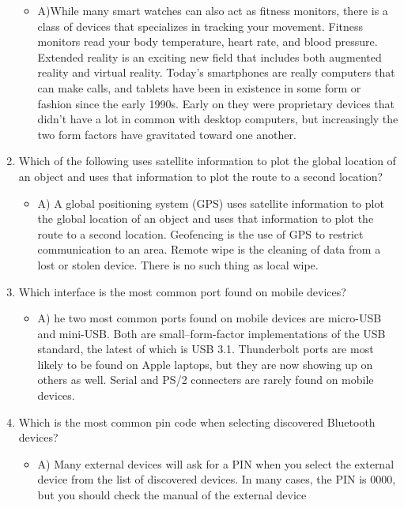 \documentclass{article}
\begin{document}
\begin{enumerate}
    \begin{itemize}
        \item A)While many smart watches can also act as fitness monitors, there is a class of devices
that specializes in tracking your movement. Fitness monitors read your body temperature,
heart rate, and blood pressure. Extended reality is an exciting new field that includes
both augmented reality and virtual reality. Today’s smartphones are really computers
that can make calls, and tablets have been in existence in some form or fashion since the
early 1990s. Early on they were proprietary devices that didn’t have a lot in common with
desktop computers, but increasingly the two form factors have gravitated toward one
another.
    \end{itemize}
    \item Which of the following uses satellite information to plot the global location of an object
and uses that information to plot the route to a second location?
    \begin{itemize}
        \item A) A global positioning system (GPS) uses satellite information to plot the global location
of an object and uses that information to plot the route to a second location. Geofencing is
the use of GPS to restrict communication to an area. Remote wipe is the cleaning of data
from a lost or stolen device. There is no such thing as local wipe.
    \end{itemize}
    \item Which interface is the most common port found on mobile devices?
    \begin{itemize}
        \item A) he two most common ports found on mobile devices are micro-USB and mini-USB.
Both are small–form-factor implementations of the USB standard, the latest of which is
USB 3.1. Thunderbolt ports are most likely to be found on Apple laptops, but they are
now showing up on others as well. Serial and PS/2 connecters are rarely found on mobile
devices. 
    \end{itemize}
    \item Which is the most common pin code when selecting discovered Bluetooth devices?
    \begin{itemize}
        \item A) Many external devices will ask for a PIN when you select the external device from the
list of discovered devices. In many cases, the PIN is 0000, but you should check the manual
of the external device

\end{itemize}
\end{enumerate}
\end{document}
